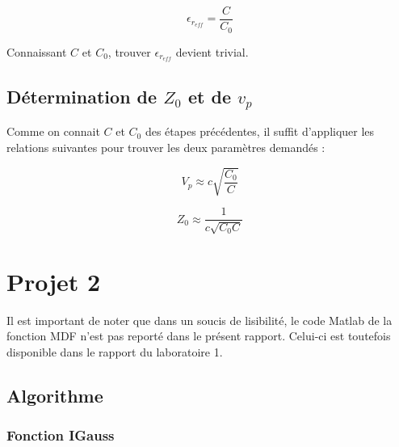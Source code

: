 \begin{equation}
	\epsilon_{r_{eff}} = \frac{C}{C_0}
\end{equation}

Connaissant $C$ et $C_0$, trouver $\epsilon_{r_{eff}}$ devient trivial.

\subsection{Détermination de $Z_0$ et de $v_p$}
Comme on connait $C$ et $C_0$ des étapes précédentes, il suffit d'appliquer les relations suivantes pour trouver les deux paramètres demandés : 

\begin{equation}
	V_p \approx c\sqrt{\frac{C_0}{C}}
\end{equation}

\begin{equation}
	Z_0 \approx \frac{1}{c\sqrt{C_0C}}
\end{equation}


\newpage
\section{Projet 2}
Il est important de noter que dans un soucis de lisibilité, le code Matlab de la fonction MDF n'est pas reporté dans le présent rapport. Celui-ci est toutefois disponible dans le rapport du laboratoire 1.

\subsection{Algorithme}
\subsubsection{Fonction IGauss}

